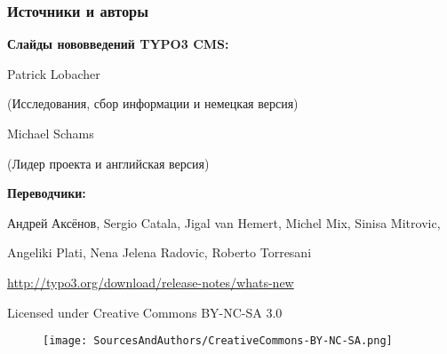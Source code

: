 \begin{frame}[fragile]
	\frametitle{Источники и авторы}

	\vspace{-0.6cm}

	\centerline{\textbf{Слайды нововведений TYPO3 CMS:}}

	\begin{center}
		\smaller
			\centerline{Patrick Lobacher}
			\centerline{(Исследования, сбор информации и немецкая версия)}
			\vspace{0.1cm}
			\centerline{Michael Schams}
			\centerline{(Лидер проекта и английская версия)}
		\normalsize
	\end{center}
	\vspace{-0.6cm}
	\begin{center}
		\smaller
			\centerline{\textbf{Переводчики:}}
			\centerline{Андрей Аксёнов, Sergio Catala, Jigal van Hemert, Michel Mix, Sinisa Mitrovic,}
			\centerline{Angeliki Plati, Nena Jelena Radovic, Roberto Torresani}
		\normalsize
	\end{center}
	\vspace{-0.6cm}
	\smaller\begin{center}\url{http://typo3.org/download/release-notes/whats-new}\end{center}\normalsize

	\smaller\begin{center}Licensed under Creative Commons BY-NC-SA 3.0\end{center}\normalsize
	\begin{figure}\vspace*{-0.3cm}
		\texttt{[image: SourcesAndAuthors/CreativeCommons-BY-NC-SA.png]}
	\end{figure}

\end{frame}

